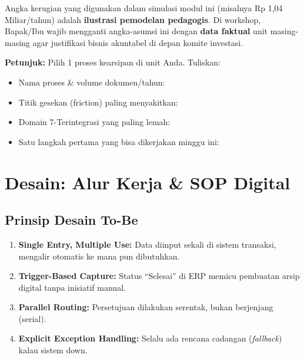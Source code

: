\documentclass[11pt,a4paper]{article}
\begin{document}
\begin{warnbox}
Angka kerugian yang digunakan dalam simulasi modul ini (misalnya Rp 1,04 Miliar/tahun) adalah \textbf{ilustrasi pemodelan pedagogis}. Di workshop, Bapak/Ibu wajib mengganti angka-asumsi ini dengan \textbf{data faktual} unit masing-masing agar justifikasi bisnis akuntabel di depan komite investasi.
\end{warnbox}

\begin{notesbox}
\small
\textbf{Petunjuk:} Pilih 1 proses kearsipan di unit Anda. Tuliskan:
\begin{itemize}[nosep, leftmargin=*]
    \item Nama proses \& volume dokumen/tahun:
    \item Titik gesekan (friction) paling menyakitkan:
    \item Domain 7-Terintegrasi yang paling lemah:
    \item Satu langkah pertama yang bisa dikerjakan minggu ini:
\end{itemize}
\vspace{1.5cm}
\end{notesbox}


\newpage

\section{Desain: Alur Kerja \& SOP Digital}

\subsection{Prinsip Desain To-Be}
\begin{enumerate}
    \item \textbf{Single Entry, Multiple Use:} Data diinput sekali di sistem transaksi, mengalir otomatis ke mana pun dibutuhkan.
    \item \textbf{Trigger-Based Capture:} Status ``Selesai'' di ERP memicu pembuatan arsip digital tanpa inisiatif manual.
    \item \textbf{Parallel Routing:} Persetujuan dilakukan serentak, bukan berjenjang (serial).
    \item \textbf{Explicit Exception Handling:} Selalu ada rencana cadangan (\textit{fallback}) kalau sistem down.
\end{enumerate}
\end{document}
